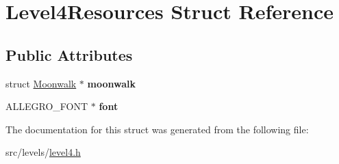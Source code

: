 \hypertarget{structLevel4Resources}{\section{Level4\+Resources Struct Reference}
\label{structLevel4Resources}
}
\subsection*{Public Attributes}
\begin{DoxyCompactItemize}
\item 
\hypertarget{structLevel4Resources_ae1fb1db4d80e61714960ec544052c046}{struct \hyperlink{structMoonwalk}{Moonwalk} $\ast$ {\bfseries moonwalk}}\label{structLevel4Resources_ae1fb1db4d80e61714960ec544052c046}

\item 
\hypertarget{structLevel4Resources_aa1b30877c0948224c319e3a6111cfed0}{A\+L\+L\+E\+G\+R\+O\+\_\+\+F\+O\+N\+T $\ast$ {\bfseries font}}\label{structLevel4Resources_aa1b30877c0948224c319e3a6111cfed0}

\end{DoxyCompactItemize}


The documentation for this struct was generated from the following file\+:\begin{DoxyCompactItemize}
\item 
src/levels/\hyperlink{level4_8h}{level4.\+h}\end{DoxyCompactItemize}
